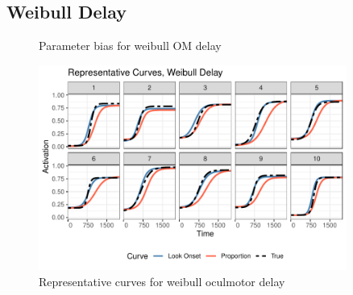 \documentclass{article}
\begin{document}
\subsection{Weibull Delay}


\begin{figure}[H]
\centering

\caption{Parameter bias for weibull OM delay}
\label{fig:par_bias_weibull_delay}
\end{figure}

\begin{figure}[H]
\centering
\includegraphics[width=0.9\textwidth]{rep_curves_weibull_delay.pdf}
\caption{Representative curves for weibull oculmotor delay}
\label{fig:rep_curves_weibull_delay}
\end{figure}
\end{document}
